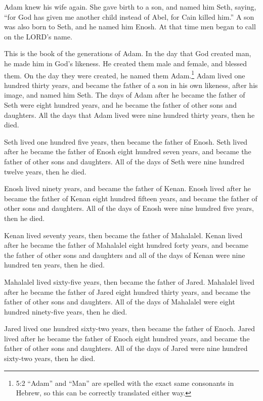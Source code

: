 \myverse{}Adam knew his wife again. She gave birth to a son, and named him Seth, saying, “for God has given me another child instead of Abel, for Cain killed him.”  \myverse{}A son was also born to Seth, and he named him Enosh. At that time men began to call on the LORD’s name.

\mychapter{}
\myverse*{}This is the book of the generations of Adam. In the day that God created man, he made him in God’s likeness. \myverse{}He created them male and female, and blessed them. On the day they were created, he named them Adam.\footnote{5:2 “Adam” and “Man” are spelled with the exact same consonants in Hebrew, so this can be correctly translated either way.} \myverse{}Adam lived one hundred thirty years, and became the father of a son in his own likeness, after his image, and named him Seth. \myverse{}The days of Adam after he became the father of Seth were eight hundred years, and he became the father of other sons and daughters. \myverse{}All the days that Adam lived were nine hundred thirty years, then he died.

\myverse{}Seth lived one hundred five years, then became the father of Enosh. \myverse{}Seth lived after he became the father of Enosh eight hundred seven years, and became the father of other sons and daughters. \myverse{}All of the days of Seth were nine hundred twelve years, then he died.

\myverse{}Enosh lived ninety years, and became the father of Kenan. \myverse{}Enosh lived after he became the father of Kenan eight hundred fifteen years, and became the father of other sons and daughters. \myverse{}All of the days of Enosh were nine hundred five years, then he died.

\myverse{}Kenan lived seventy years, then became the father of Mahalalel. \myverse{}Kenan lived after he became the father of Mahalalel eight hundred forty years, and became the father of other sons and daughters \myverse{}and all of the days of Kenan were nine hundred ten years, then he died.

\myverse{}Mahalalel lived sixty-five years, then became the father of Jared. \myverse{}Mahalalel lived after he became the father of Jared eight hundred thirty years, and became the father of other sons and daughters. \myverse{}All of the days of Mahalalel were eight hundred ninety-five years, then he died.

\myverse{}Jared lived one hundred sixty-two years, then became the father of Enoch. \myverse{}Jared lived after he became the father of Enoch eight hundred years, and became the father of other sons and daughters. \myverse{}All of the days of Jared were nine hundred sixty-two years, then he died.

